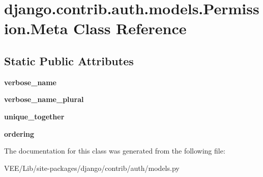 \hypertarget{classdjango_1_1contrib_1_1auth_1_1models_1_1_permission_1_1_meta}{}\section{django.\+contrib.\+auth.\+models.\+Permission.\+Meta Class Reference}
\label{classdjango_1_1contrib_1_1auth_1_1models_1_1_permission_1_1_meta}
\subsection*{Static Public Attributes}
\begin{DoxyCompactItemize}
\item 
\mbox{\label{classdjango_1_1contrib_1_1auth_1_1models_1_1_permission_1_1_meta_a0cc956157e25952ab19885c9ffe08c6e}} 
{\bfseries verbose\+\_\+name}
\item 
\mbox{\label{classdjango_1_1contrib_1_1auth_1_1models_1_1_permission_1_1_meta_a5dad5e740e8ec7c1e19851bee00d40fd}} 
{\bfseries verbose\+\_\+name\+\_\+plural}
\item 
\mbox{\label{classdjango_1_1contrib_1_1auth_1_1models_1_1_permission_1_1_meta_a06400375ef5ce52cc5fd28b4862ac4ff}} 
{\bfseries unique\+\_\+together}
\item 
\mbox{\label{classdjango_1_1contrib_1_1auth_1_1models_1_1_permission_1_1_meta_a5f49e27b75daf45b12366d94447a5d3f}} 
{\bfseries ordering}
\end{DoxyCompactItemize}


The documentation for this class was generated from the following file\+:\begin{DoxyCompactItemize}
\item 
V\+E\+E/\+Lib/site-\/packages/django/contrib/auth/models.\+py\end{DoxyCompactItemize}
